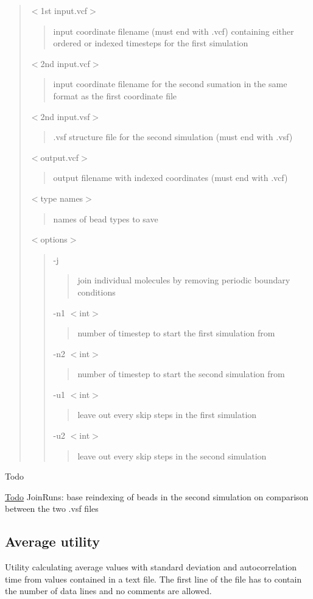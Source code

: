 \begin{quote}
{\ttfamily $<$1st input.\+vcf$>$} \begin{quote}
input coordinate filename (must end with {\ttfamily .vcf}) containing either ordered or indexed timesteps for the first simulation \end{quote}
{\ttfamily $<$2nd input.\+vcf$>$} \begin{quote}
input coordinate filename for the second sumation in the same format as the first coordinate file \end{quote}
{\ttfamily $<$2nd input.\+vsf$>$} \begin{quote}
{\ttfamily .vsf} structure file for the second simulation (must end with {\ttfamily .vsf}) \end{quote}
{\ttfamily $<$output.\+vcf$>$} \begin{quote}
output filename with indexed coordinates (must end with {\ttfamily .vcf}) \end{quote}
{\ttfamily $<$type names$>$} \begin{quote}
names of bead types to save \end{quote}
{\ttfamily $<$options$>$} \begin{quote}
{\ttfamily -\/j} \begin{quote}
join individual molecules by removing periodic boundary conditions \end{quote}
{\ttfamily -\/n1 $<$int$>$} \begin{quote}
number of timestep to start the first simulation from \end{quote}
{\ttfamily -\/n2 $<$int$>$} \begin{quote}
number of timestep to start the second simulation from \end{quote}
{\ttfamily -\/u1 $<$int$>$} \begin{quote}
leave out every {\ttfamily skip} steps in the first simulation \end{quote}
{\ttfamily -\/u2 $<$int$>$} \begin{quote}
leave out every {\ttfamily skip} steps in the second simulation \end{quote}
\end{quote}
\end{quote}


\begin{DoxyRefDesc}{Todo}
\item[\hyperlink{todo__todo000007}{Todo}]Join\+Runs\+: base reindexing of beads in the second simulation on comparison between the two {\ttfamily .vsf} files \end{DoxyRefDesc}
\hypertarget{Common_Average}{}\subsection{Average utility}\label{Common_Average}
Utility calculating average values with standard deviation and autocorrelation time from values contained in a text file. The first line of the file has to contain the number of data lines and no comments are allowed.


